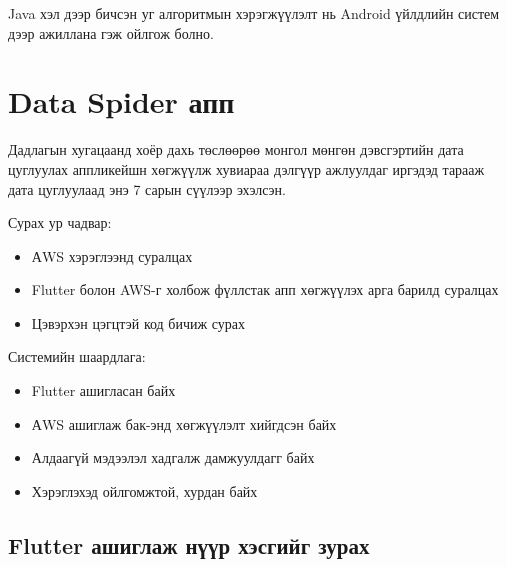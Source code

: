 Java хэл дээр бичсэн уг алгоритмын хэрэгжүүлэлт нь Android үйлдлийн систем дээр ажиллана гэж ойлгож болно.

\pagebreak

\section{Data Spider апп}
Дадлагын хугацаанд хоёр дахь төслөөрөө монгол мөнгөн дэвсгэртийн дата цуглуулах аппликейшн хөгжүүлж хувиараа дэлгүүр ажлуулдаг иргэдэд тарааж дата цуглуулаад энэ 7 сарын сүүлээр эхэлсэн.

Сурах ур чадвар: 
\begin{itemize}
    \item АWS хэрэглээнд суралцах
    \item Flutter болон AWS-г холбож фүллстак апп хөгжүүлэх арга барилд суралцах
    \item Цэвэрхэн цэгцтэй код бичиж сурах
\end{itemize}

Системийн шаардлага: 
\begin{itemize}
    \item Flutter ашигласан байх
    \item АWS ашиглаж бак-энд хөгжүүлэлт хийгдсэн байх
    \item Алдаагүй мэдээлэл хадгалж дамжуулдагг байх
    \item Хэрэглэхэд ойлгомжтой, хурдан байх
\end{itemize}

\subsection{Flutter ашиглаж нүүр хэсгийг зурах}

